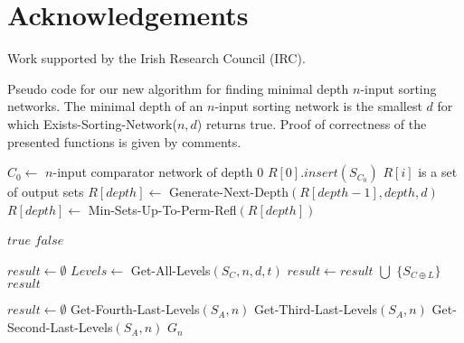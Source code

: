 \documentclass[13pt,a4paper]{article}
\begin{document}
\section{Acknowledgements}



Work supported by the Irish Research Council (IRC).










\begin{algorithm} [H]
\caption{Pseudo code for our new algorithm for finding minimal depth $n$-input sorting networks. The minimal depth of an $n$-input sorting network is the smallest $d$ for which Exists-Sorting-Network($n, d$) returns true. Proof of correctness of the presented functions is given by comments.}
\label{algo:MinDepthSortNet}
\begin{algorithmic} [1]
\State $C_0 \leftarrow $ $n$-input comparator network of depth 0
\State $R[0].insert(S_{C_0})$
\Comment $R[i]$ is a set of output sets
	\State $R[depth] \leftarrow$ Generate-Next-Depth$(R[depth - 1], depth, d)$
	\State $R[depth] \leftarrow $ Min-Sets-Up-To-Perm-Refl$(R[depth])$
\EndFor

		\State \Return $true$
	\EndIf
\EndIf
\State \Return $false$
\EndFunction

\State

\State $result \leftarrow \emptyset$
	\State $Levels \longleftarrow$ Get-All-Levels$ ( S_C, n, d, t ) $
		\State $result \longleftarrow result$ $\bigcup$ $\{ S_{C \oplus L} \}$
	\EndFor
\EndFor
\State \Return $result$
\EndFunction

\State

\State $result \leftarrow \emptyset$
	\State \Return Get-Fourth-Last-Levels$ ( S_A, n ) $
\EndIf
{}
	\State \Return Get-Third-Last-Levels$ ( S_A, n ) $
\EndIf
{}
	\State \Return Get-Second-Last-Levels$ ( S_A, n ) $
\EndIf
\State \Return $G_n$
\EndFunction
\end{algorithmic}
\end{algorithm}
\end{document}
